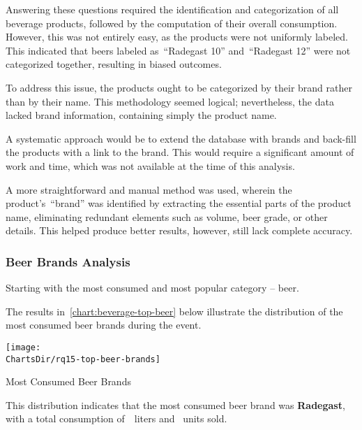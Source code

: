 Answering these questions required the identification and categorization of all beverage products, followed by the computation of their overall consumption.
However, this was not entirely easy, as the products were not uniformly labeled.
This indicated that beers labeled as~\enquote{Radegast 10} and~\enquote{Radegast 12} were not categorized together, resulting in biased outcomes.

To address this issue, the products ought to be categorized by their brand rather than by their name.
This methodology seemed logical; nevertheless, the data lacked brand information, containing simply the product name.

A systematic approach would be to extend the database with brands and back-fill the products with a link to the brand.
This would require a significant amount of work and time, which was not available at the time of this analysis.

A more straightforward and manual method was used, wherein the product's~\enquote{brand} was identified by extracting the essential parts of the product name, eliminating redundant elements such as volume, beer grade, or other details.
This helped produce better results, however, still lack complete accuracy.


\subsubsection{Beer Brands Analysis}
\label{subsubsec:analysis-beverage-popular-beer}
Starting with the most consumed and most popular category – beer.


The results in~\autoref{chart:beverage-top-beer} below illustrate the distribution of the most consumed beer brands during the event.

\begin{chart}[H]
	\centering
	\texttt{[image: \\ChartsDir/rq15-top-beer-brands]}
	\caption{ Most Consumed Beer Brands}
	\label{chart:beverage-top-beer}
	\source
\end{chart}

This distribution indicates that the most consumed beer brand was \textbf{Radegast}, with a total consumption of~~liters and~ units sold.

